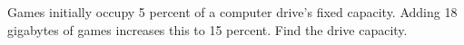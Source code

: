 Games initially occupy 5 percent of a computer drive's fixed capacity. Adding 18 gigabytes of games increases this to 15 percent. Find the drive capacity.
